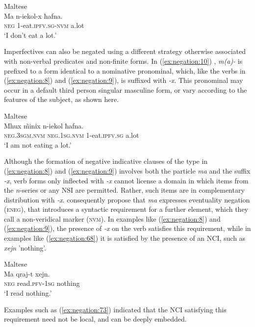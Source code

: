 \documentclass[output=paper,hidelinks]{langscibook}
\begin{document}
\ea\label{ex:negation:9} Maltese  \citep [147]{camilleri-sadler:2017}\\
\gll Ma n-iekol-x ħafna.\\  
    \textsc{neg} 1-eat.\textsc{ipfv.sg-nvm} a.lot\\ 
\glt `I don't eat a lot.'
\z

Imperfectives can also be negated using a different strategy otherwise associated with non-verbal predicates and non-finite forms. In (\ref{ex:negation:10}) , \emph{m(a)-} is prefixed to a form identical to a nominative pronominal, which, like the verbs in (\ref{ex:negation:8})  and (\ref{ex:negation:9}), is suffixed with \emph{-x}. This pronominal may occur in a default third person singular masculine form, or vary according to the features of the subject, as shown here.

\ea\label{ex:negation:10}Maltese \citep [148]{camilleri-sadler:2017}\\
\gll Mhux \~ minix n-iekol ħafna.\\  
    \textsc{neg.3sgm.nvm} \~ \textsc{neg.1sg.nvm} 1-eat.\textsc{ipfv.sg} a.lot\\ 
\glt `I am not eating a lot.'
\z

Although the formation of negative indicative clauses of the type in (\ref{ex:negation:8}) and (\ref{ex:negation:9}) involves both the particle \emph{ma} and the suffix \emph{-x}, verb forms only inflected with \emph{-x}  cannot license a domain in which items from the \emph{n}-series or any \textsc{NSI} are permitted. Rather, such items are in complementary distribution with \emph{-x}.  \citet [150]{camilleri-sadler:2017} consequently propose that \emph{ma} expresses eventuality negation (\textsc{eneg}), that introduces a syntactic requirement for a further element, which they call a non-veridical marker (\textsc{nvm}). In examples like (\ref{ex:negation:8}) and (\ref{ex:negation:9}), the presence of \emph{-x} on the verb satisfies this requirement, while in examples like (\ref{ex:negation:68}) it is satisfied by the presence of an NCI, such as \emph{xejn} 'nothing'.

\ea\label{ex:negation:68}Maltese \citep [159]{camilleri-sadler:2017}\\
\gll Ma qraj-t xejn.\\  
    \textsc{neg} read.\textsc{pfv-1sg} nothing\\ 
\glt `I read nothing.'
\z

Examples such as (\ref{ex:negation:73}) indicated that the NCI satisfying this requirement need not be local, and can be deeply embedded.
\end{document}
